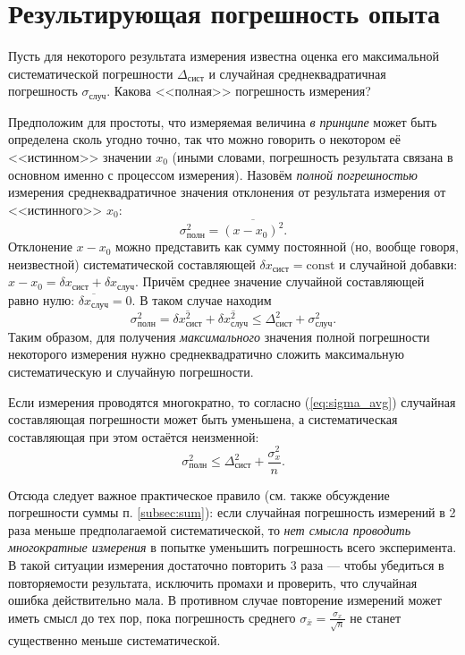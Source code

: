 \section{Результирующая погрешность опыта}

Пусть для некоторого результата измерения известна оценка его максимальной
систематической погрешности $\Delta_{\text{сист}}$ и случайная среднеквадратичная
погрешность $\sigma_{\text{случ}}$. Какова <<полная>>
погрешность измерения?

Предположим для простоты, что измеряемая величина \emph{в принципе}
может быть определена сколь угодно точно, так что можно говорить о
некотором её <<истинном>> значении $x_{0}$
(иными словами, погрешность результата связана в основном именно с
процессом измерения). Назовём \emph{полной погрешностью} измерения
среднеквадратичное значения отклонения от результата измерения от
<<истинного>> $x_{0}$: 
\[
\sigma_{\text{полн}}^{2}=\overline{\left(x-x_{0}\right)^{2}}.
\]
Отклонение $x-x_{0}$ можно представить как сумму постоянной (но,
вообще говоря, неизвестной) систематической составляющей $\delta x_{\text{сист}}=\mathrm{const}$
и случайной добавки: $x-x_{0}=\delta x_{\text{сист}}+\delta x_{\text{случ}}$.
Причём среднее значение случайной составляющей равно нулю: $\overline{\delta x_{\text{случ}}}=0$.
В таком случае находим
\begin{equation}
\sigma_{\text{полн}}^{2}=\overline{\delta x_{\text{сист}}^{2}}+\overline{\delta x_{\text{случ}}^{2}}\le\Delta_{\text{сист}}^{2}+\sigma_{\text{случ}}^{2}.\label{eq:syst_full}
\end{equation}
Таким образом, для получения \emph{максимального} значения полной
погрешности некоторого измерения нужно среднеквадратично сложить максимальную
систематическую и случайную погрешности.

Если измерения проводятся многократно, то согласно (\ref{eq:sigma_avg})
случайная составляющая погрешности может быть уменьшена, а систематическая
составляющая при этом остаётся неизменной:
\[
\sigma_{\text{полн}}^{2}\le\Delta_{\text{сист}}^{2}+\frac{\sigma_{x}^{2}}{n}.
\]

Отсюда следует важное практическое правило (см. также обсуждение погрешности
суммы п. \ref{subsec:sum}): если случайная погрешность измерений
в 2 раза меньше предполагаемой систематической, то \emph{нет
смысла проводить многократные измерения} в попытке уменьшить погрешность
всего эксперимента. В такой ситуации измерения достаточно повторить
3 раза --- чтобы убедиться в повторяемости
результата, исключить промахи и проверить, что случайная ошибка действительно
мала. В противном случае повторение измерений может иметь смысл до
тех пор, пока погрешность среднего $\sigma_{\overline{x}}=\frac{\sigma_{x}}{\sqrt{n}}$
не станет существенно меньше систематической.

